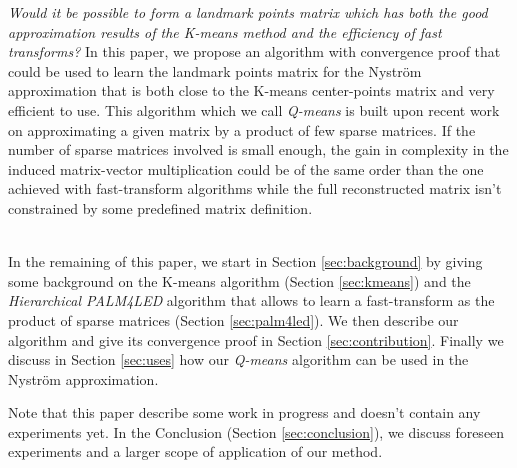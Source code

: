 \textit{Would it be possible to form a landmark points matrix which has both the good approximation results of the K-means method and the efficiency of fast transforms?} In this paper, we propose an algorithm with convergence proof that could be used to learn the landmark points matrix for the Nyström approximation that is both close to the K-means center-points matrix and very efficient to use. This algorithm which we call \textit{Q-means} is built upon recent work \cite{magoarou2014learning} on approximating a given matrix by a product of few sparse matrices. If the number of sparse matrices involved is small enough, the gain in complexity in the induced matrix-vector multiplication could be of the same order than the one achieved with fast-transform algorithms while the full reconstructed matrix isn't constrained by some predefined matrix definition.

~\\
In the remaining of this paper, we start in Section \ref{sec:background} by giving some background on the K-means algorithm (Section \ref{sec:kmeans}) and the \textit{Hierarchical PALM4LED} algorithm that allows to learn a fast-transform as the product of sparse matrices (Section \ref{sec:palm4led}). We then describe our algorithm and give its convergence proof in Section \ref{sec:contribution}. Finally we discuss in Section \ref{sec:uses} how our \textit{Q-means} algorithm can be used in the Nyström approximation.

Note that this paper describe some work in progress and doesn't contain any experiments yet. In the Conclusion (Section \ref{sec:conclusion}), we discuss foreseen experiments and a larger scope of application of our method.

